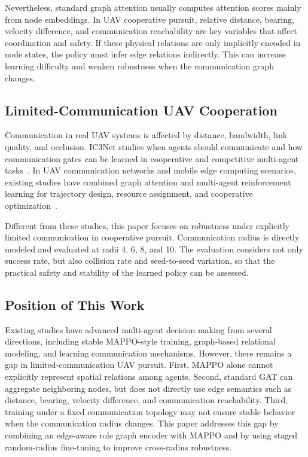 Nevertheless, standard graph attention usually computes attention scores mainly from node embeddings. In UAV cooperative pursuit, relative distance, bearing, velocity difference, and communication reachability are key variables that affect coordination and safety. If these physical relations are only implicitly encoded in node states, the policy must infer edge relations indirectly. This can increase learning difficulty and weaken robustness when the communication graph changes.

\subsection{Limited-Communication UAV Cooperation}

Communication in real UAV systems is affected by distance, bandwidth, link quality, and occlusion. IC3Net studies when agents should communicate and how communication gates can be learned in cooperative and competitive multi-agent tasks~\cite{singh2018ic3net}. In UAV communication networks and mobile edge computing scenarios, existing studies have combined graph attention and multi-agent reinforcement learning for trajectory design, resource assignment, and cooperative optimization~\cite{feng2024gat_uav_comm,kim2024uav_mec_madrl}.

Different from these studies, this paper focuses on robustness under explicitly limited communication in cooperative pursuit. Communication radius is directly modeled and evaluated at radii 4, 6, 8, and 10. The evaluation considers not only success rate, but also collision rate and seed-to-seed variation, so that the practical safety and stability of the learned policy can be assessed.

\subsection{Position of This Work}

Existing studies have advanced multi-agent decision making from several directions, including stable MAPPO-style training, graph-based relational modeling, and learning communication mechanisms. However, there remains a gap in limited-communication UAV pursuit. First, MAPPO alone cannot explicitly represent spatial relations among agents. Second, standard GAT can aggregate neighboring nodes, but does not directly use edge semantics such as distance, bearing, velocity difference, and communication reachability. Third, training under a fixed communication topology may not ensure stable behavior when the communication radius changes. This paper addresses this gap by combining an edge-aware role graph encoder with MAPPO and by using staged random-radius fine-tuning to improve cross-radius robustness.
